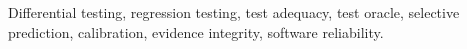 Differential testing, regression testing, test adequacy, test oracle, selective prediction, calibration, evidence integrity, software reliability.

